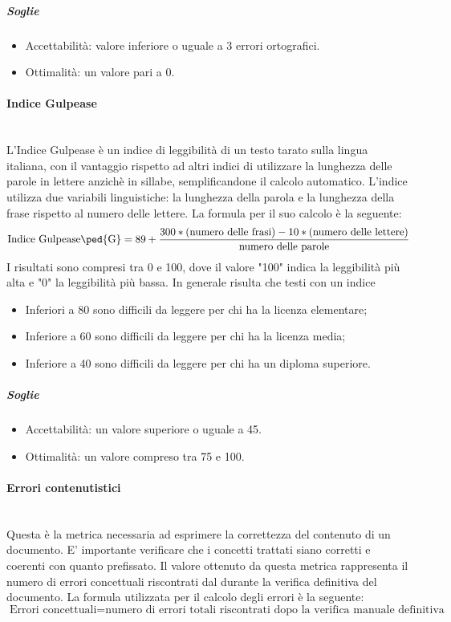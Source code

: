 \subparagraph{Soglie}
\begin{itemize}
\item Accettabilità: valore inferiore o uguale a 3 errori ortografici.
\item Ottimalità: un valore pari a 0.
\end{itemize}

\paragraph{Indice Gulpease}
\label{AppB:IndiceGulpease}
	~\\L'{Indice Gulpease} è un indice di leggibilità di un testo tarato sulla lingua italiana, con il vantaggio rispetto ad altri indici di utilizzare la lunghezza delle parole in lettere anzichè in sillabe, semplificandone il calcolo automatico. L'indice utilizza due variabili linguistiche: la lunghezza della parola e la lunghezza della frase rispetto al numero delle lettere.
\newline La formula per il suo calcolo è la seguente:
\begin{displaymath}
\mbox{{Indice Gulpease}\ped{G}}= 89+\frac{300*\mbox{(numero delle frasi)}-10*\mbox{(numero delle lettere)}}{\mbox{numero delle parole}}
\end{displaymath}
I risultati sono compresi tra 0 e 100, dove il valore "100" indica la leggibilità più alta e "0" la leggibilità più bassa. In generale risulta che testi con un indice
\begin{itemize}
	\item Inferiori a 80 sono difficili da leggere per chi ha la licenza elementare;
	\item Inferiore a 60 sono difficili da leggere per chi ha la licenza media;
	\item Inferiore a 40 sono difficili da leggere per chi ha un diploma superiore.
\end{itemize}

\subparagraph{Soglie}
\begin{itemize}
\item Accettabilità: un valore superiore o uguale a 45.
\item Ottimalità: un valore compreso tra 75 e 100.
\end{itemize}

\paragraph{Errori contenutistici}
\label{AppB:ErroriCont}
	~\\Questa è la metrica necessaria ad esprimere la correttezza del contenuto di un documento. E' importante verificare che i concetti trattati siano corretti e coerenti con quanto prefissato. Il valore ottenuto da questa metrica rappresenta il numero di errori concettuali riscontrati dal \ver{} durante la verifica definitiva del documento.
\newline La formula utilizzata per il calcolo degli errori è la seguente:
\begin{displaymath}
\mbox{Errori concettuali}={\mbox{numero di errori totali riscontrati dopo la verifica manuale definitiva}}
\end{displaymath}

